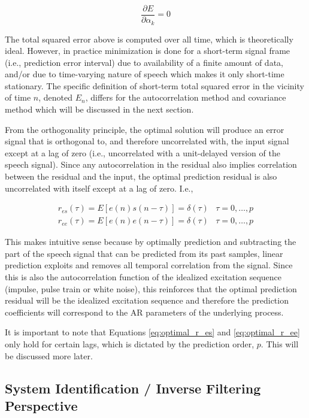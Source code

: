 \begin{equation}
	    \frac{\partial E}{\partial \alpha_k}=0
\end{equation}

The total squared error above is computed over all time, which is theoretically ideal. However, in practice minimization is done for a short-term signal frame (i.e., prediction error interval) due to availability of a finite amount of data, and/or due to time-varying nature of speech which makes it only short-time stationary. The specific definition of short-term total squared error in the vicinity of time $n$, denoted $E_n$, differs for the autocorrelation method and covariance method which will be discussed in the next section.

From the orthogonality principle, the optimal solution will produce an error signal that is orthogonal to, and therefore uncorrelated with, the input signal except at a lag of zero (i.e., uncorrelated with a unit-delayed version of the speech signal). Since any autocorrelation in the residual also implies correlation between the residual and the input, the optimal prediction residual is also uncorrelated with itself except at a lag of zero. I.e.,

\begin{eqnarray}
	r_{es}(\tau) = E\left[e(n)s(n-\tau)\right]=\delta(\tau) & \tau=0,\dots,p \label{eq:optimal_r_es} \\
	r_{ee}(\tau) = E\left[e(n)e(n-\tau)\right]=\delta(\tau)  & \tau=0,\dots,p  \label{eq:optimal_r_ee}
\end{eqnarray}

This makes intuitive sense because by optimally prediction and subtracting the part of the speech signal that can be predicted from its past samples, linear prediction exploits and removes all temporal correlation from the signal. Since this is also the autocorrelation function of the idealized excitation sequence (impulse, pulse train or white noise), this reinforces that the optimal prediction residual will be the idealized excitation sequence and therefore the prediction coefficients will correspond to the AR parameters of the underlying process.

It is important to note that Equations  \ref{eq:optimal_r_es} and \ref{eq:optimal_r_ee} only hold for certain lags, which is dictated by the prediction order, $p$. This will be discussed more later.


\subsection{System Identification / Inverse Filtering Perspective}

